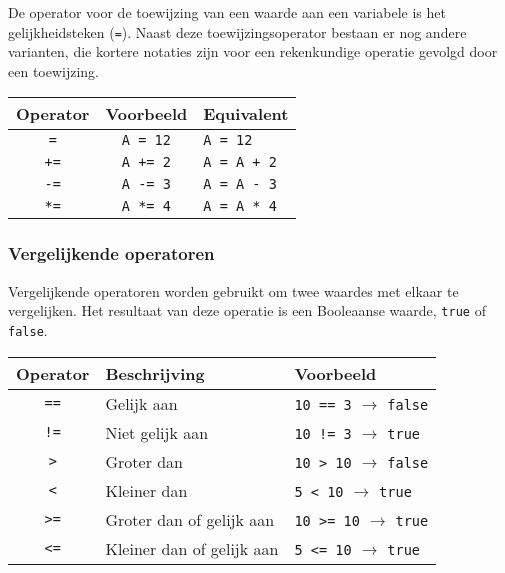 \documentclass[11pt,fleqn]{book} %
\begin{document}
De operator voor de toewijzing van een waarde aan een variabele is het gelijkheidsteken (\texttt{=}). Naast deze toewijzingsoperator bestaan er nog andere varianten, die kortere notaties zijn voor een rekenkundige operatie gevolgd door een toewijzing.

\begin{center}
	\begin{tabular}{c c l}
		\toprule
		\textbf{Operator} & \textbf{Voorbeeld}                     & \textbf{Equivalent}           \\ \midrule
		\texttt{=} & \texttt{A = 12} & \texttt{A = 12}\\
		\texttt{+=} & \texttt{A += 2} & \texttt{A = A + 2} \\
		\texttt{-=} & \texttt{A -= 3} & \texttt{A = A - 3} \\
		\texttt{*=} & \texttt{A *= 4} & \texttt{A = A * 4} \\
		\bottomrule
	\end{tabular}
\end{center}

\subsubsection{Vergelijkende operatoren}
Vergelijkende operatoren worden gebruikt om twee waardes met elkaar te vergelijken. Het resultaat van deze operatie is een Booleaanse waarde, \texttt{true} of \texttt{false}.

\begin{center}
	\begin{tabular}{c l l}
		\toprule
		\textbf{Operator} & \textbf{Beschrijving}     & \textbf{Voorbeeld}                                     \\ \midrule
		   \texttt{==}    & Gelijk aan                & \texttt{10 == 3} $\rightarrow$ \texttt{false} \\
		   \texttt{!=}    & Niet gelijk aan           & \texttt{10 != 3} $\rightarrow$ \texttt{true}  \\
		   \texttt{>}     & Groter dan                & \texttt{10 > 10} $\rightarrow$ \texttt{false} \\
		   \texttt{<}     & Kleiner dan               & \texttt{5 < 10} $\rightarrow$ \texttt{true}   \\
		   \texttt{>=}    & Groter dan of gelijk aan  & \texttt{10 >= 10} $\rightarrow$ \texttt{true} \\
		   \texttt{<=}    & Kleiner dan of gelijk aan & \texttt{5 <= 10} $\rightarrow$ \texttt{true}  \\ \bottomrule
	\end{tabular}
\end{center}
\end{document}
